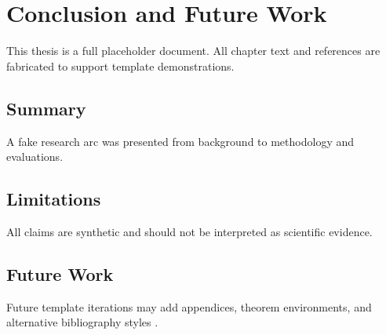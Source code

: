 \chapter{Conclusion and Future Work}
\label{chap:conclusion}

This thesis is a full placeholder document. All chapter text and references are fabricated to support template demonstrations.

\section{Summary}
A fake research arc was presented from background to methodology and evaluations.

\section{Limitations}
All claims are synthetic and should not be interpreted as scientific evidence.

\section{Future Work}
Future template iterations may add appendices, theorem environments, and alternative bibliography styles \cite{adams2026tools}.
